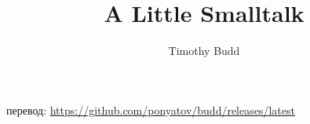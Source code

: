 

\title{A Little Smalltalk}
\author{Timothy Budd}



\maketitle

перевод: \url{https://github.com/ponyatov/budd/releases/latest}

\medskip
{}

\tableofcontents






